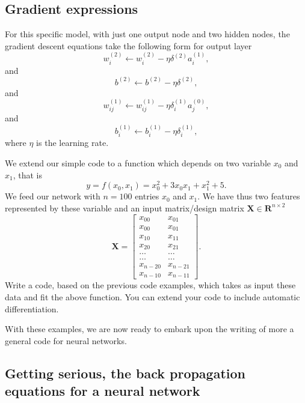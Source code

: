 \documentclass[%
oneside,                 %
final,                   %
10pt]{article}
\newenvironment{doconceexercise}{}{}
\newcounter{doconceexercisecounter}
\begin{document}
\subsection{Gradient expressions}

For this specific model, with just one output node and two hidden
nodes, the gradient descent equations take the following form for output layer
\[
w_{i}^{(2)}\leftarrow w_{i}^{(2)}- \eta \delta^{(2)} a_{i}^{(1)},
\]
and
\[
b^{(2)} \leftarrow b^{(2)}-\eta \delta^{(2)},
\]
and
\[
w_{ij}^{(1)}\leftarrow w_{ij}^{(1)}- \eta \delta_{i}^{(1)} a_{j}^{(0)},
\]
and
\[
b_{i}^{(1)} \leftarrow b_{i}^{(1)}-\eta \delta_{i}^{(1)},
\]
where $\eta$ is the learning rate.


\begin{doconceexercise}

                             

We extend our simple code to a function which depends on two variable $x_0$ and $x_1$, that is
\[
y=f(x_0,x_1)=x_0^2+3x_0x_1+x_1^2+5.
\]
We feed our network with $n=100$ entries $x_0$ and $x_1$. We have thus two features represented by these variable and an input matrix/design matrix $\bm{X}\in \mathbf{R}^{n\times 2}$
\[
\bm{X}=\begin{bmatrix} x_{00} & x_{01} \\ x_{00} & x_{01} \\ x_{10} & x_{11} \\ x_{20} & x_{21} \\ \dots & \dots \\ \dots & \dots \\ x_{n-20} & x_{n-21} \\ x_{n-10} & x_{n-11} \end{bmatrix}.
\]
Write a code, based on the previous code examples, which takes as input these data and fit the above function.
You can extend your code to include automatic differentiation.

With these examples, we are now ready to embark upon the writing of more a general code for neural networks.

\end{doconceexercise}

\subsection{Getting serious, the  back propagation equations for a neural network}
\end{document}
